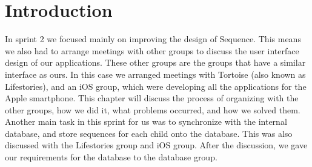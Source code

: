 \section{Introduction}
In sprint 2 we focused mainly on improving the design of Sequence. 
This means we also had to arrange meetings with other groups to discuss the user interface design of our applications. These other groups are the groups that have a similar interface as ours.
In this case we arranged meetings with Tortoise (also known as Lifestories), and an iOS group, which were developing all the applications for the Apple smartphone.
This chapter will discuss the process of organizing with the other groups, how we did it, what problems occurred, and how we solved them.
Another main task in this sprint for us was to synchronize with the internal database, and store sequences for each child onto the database. This was also discussed with the Lifestories group and iOS group. After the discussion, we gave our requirements for the database to the database group.
